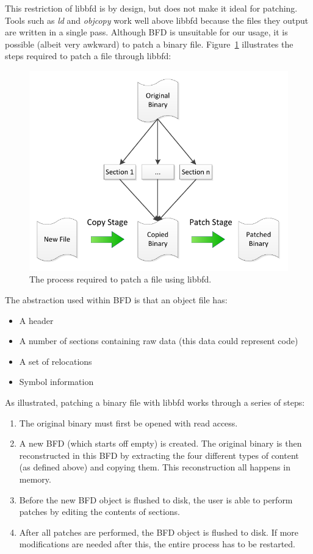 This restriction of libbfd is by design, but does not make it ideal for patching. Tools such as \emph{ld} and \emph{objcopy} work well above libbfd because the files they output are written in a single pass. Although BFD is unsuitable for our usage, it is possible (albeit very awkward) to patch a binary file. Figure~\ref{fig:BAL_Approach1} illustrates the steps required to patch a file through libbfd:

\begin{figure}[H]
 \centering
 \includegraphics{Binary_Abstraction_Layer_Approach1.pdf}
 \caption{The process required to patch a file using libbfd.}
\label{fig:BAL_Approach1}
\end{figure}

The abstraction used within BFD is that an object file has:

\begin{itemize}
\item A header
\item A number of sections containing raw data (this data could represent code)
\item A set of relocations
\item Symbol information
\end{itemize}

As illustrated, patching a binary file with libbfd works through a series of steps:

\begin{enumerate}
\item The original binary must first be opened with read access.
\item A new BFD (which starts off empty) is created. The original binary is then reconstructed in this BFD by extracting the four different types of content (as defined above) and copying them. This reconstruction all happens in memory.
\item Before the new BFD object is flushed to disk, the user is able to perform patches by editing the contents of sections.
\item After all patches are performed, the BFD object is flushed to disk. If more modifications are needed after this, the entire process has to be restarted.
\end{enumerate}

